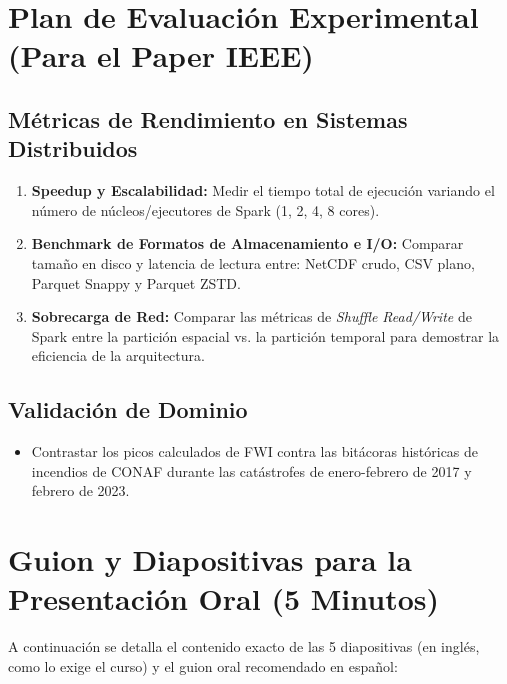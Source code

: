 \documentclass[11pt,a4paper]{article}
\begin{document}
\section{Plan de Evaluación Experimental (Para el Paper IEEE)}

\subsection{Métricas de Rendimiento en Sistemas Distribuidos}
\begin{enumerate}[leftmargin=5mm]
    \item \textbf{Speedup y Escalabilidad:} Medir el tiempo total de ejecución variando el número de núcleos/ejecutores de Spark (1, 2, 4, 8 cores).
    \item \textbf{Benchmark de Formatos de Almacenamiento e I/O:} Comparar tamaño en disco y latencia de lectura entre: NetCDF crudo, CSV plano, Parquet Snappy y Parquet ZSTD.
    \item \textbf{Sobrecarga de Red:} Comparar las métricas de \textit{Shuffle Read/Write} de Spark entre la partición espacial vs. la partición temporal para demostrar la eficiencia de la arquitectura.
\end{enumerate}

\subsection{Validación de Dominio}
\begin{itemize}[leftmargin=5mm]
    \item Contrastar los picos calculados de FWI contra las bitácoras históricas de incendios de CONAF durante las catástrofes de enero-febrero de 2017 y febrero de 2023.
\end{itemize}

\section{Guion y Diapositivas para la Presentación Oral (5 Minutos)}

\noindent A continuación se detalla el contenido exacto de las 5 diapositivas (en inglés, como lo exige el curso) y el guion oral recomendado en español:

\vspace{0.3cm}
\end{document}
